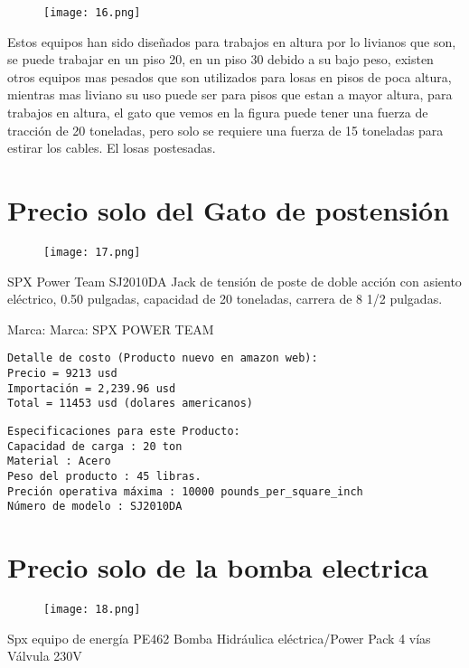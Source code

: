 \begin{figure}
\centering
\texttt{[image: 16.png]}
\end{figure}

Estos equipos han sido diseñados para trabajos en altura por lo livianos
que son, se puede trabajar en un piso 20, en un piso 30 debido a su bajo
peso, existen otros equipos mas pesados que son utilizados para losas
en pisos de poca altura, mientras mas liviano su uso puede ser para pisos
que estan a mayor altura, para trabajos en altura, el gato que vemos en
la figura puede tener una fuerza de tracción de 20 toneladas, pero
solo se requiere una fuerza de 15 toneladas para estirar los cables. El
losas postesadas.

\section{Precio solo del Gato de postensión}

\begin{figure}[H]
\centering
\texttt{[image: 17.png]}
\end{figure}

SPX Power Team SJ2010DA Jack de tensión de poste de doble acción con
asiento eléctrico, 0.50 pulgadas, capacidad de 20 toneladas,
carrera de 8 1/2 pulgadas.

Marca: Marca: SPX POWER TEAM

\begin{verbatim}
Detalle de costo (Producto nuevo en amazon web):
Precio = 9213 usd
Importación = 2,239.96 usd
Total = 11453 usd (dolares americanos)
\end{verbatim}

\begin{verbatim}
Especificaciones para este Producto:
Capacidad de carga : 20 ton
Material : Acero
Peso del producto : 45 libras.
Preción operativa máxima : 10000 pounds_per_square_inch
Número de modelo : SJ2010DA
\end{verbatim}

\section{Precio solo de la bomba electrica}

\begin{figure}[H]
\centering
\texttt{[image: 18.png]}
\end{figure}

Spx equipo de energía PE462 Bomba Hidráulica eléctrica/Power
Pack 4 vías Válvula 230V

